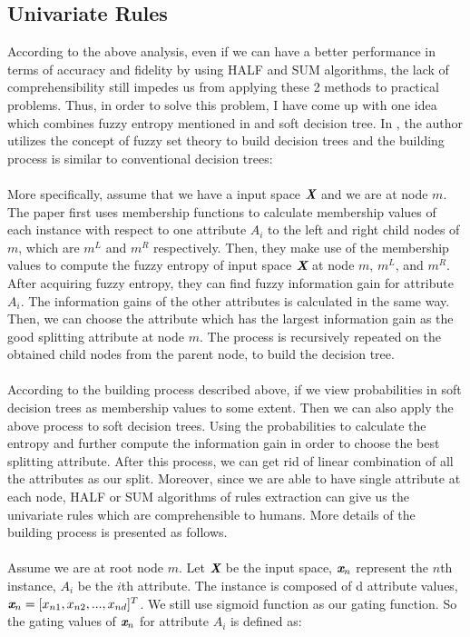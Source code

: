 \documentclass[12pt]{article}%
\begin{document}
\subsection{Univariate Rules}
According to the above analysis, even if we can have a better performance in terms of accuracy and fidelity by using HALF and SUM algorithms, the lack of comprehensibility still impedes us from applying these 2 methods to practical problems. Thus, in order to solve this problem, I have come up with one idea which combines fuzzy entropy mentioned in \cite{kumar2016ensemble} and soft decision tree. In \cite{kumar2016ensemble}, the author utilizes the concept of fuzzy set theory to build decision trees and the building process is similar to conventional decision trees:
\\\\
More specifically, assume that we have a input space $\emph{\textbf X}$ and we are at node $m$. The paper first uses membership functions to calculate membership values of each instance with respect to one attribute $A_i$ to the left and right child nodes of $m$, which are $m^L$ and $m^R$ respectively. Then, they make use of the membership values to compute the fuzzy entropy of input space $\emph{\textbf X}$ at node $m$, $m^L$, and $m^R$. After acquiring fuzzy entropy, they can find fuzzy information gain for attribute $A_i$. The information gains of the other attributes is calculated in the same way. Then, we can choose the attribute which has the largest information gain as the good splitting attribute at node $m$. The process is recursively repeated on the obtained child nodes from the parent node, to build the decision tree.
\\\\
According to the building process described above, if we view probabilities in soft decision trees as membership values to some extent. Then we can also apply the above process to soft decision trees. Using the probabilities to calculate the entropy and further compute the information gain in order to choose the best splitting attribute. After this process, we can get rid of linear combination of all the attributes as our split. Moreover, since we are able to have single attribute at each node, HALF or SUM algorithms of rules extraction can give us the univariate rules which are comprehensible to humans. More details of the building process is presented as follows.
\\\\
Assume we are at root node $m$. Let $\emph{\textbf X}$ be the input space, $\emph{\textbf x}_n$ represent the $n$th instance, $A_i$ be the $i$th attribute. The instance is composed of d attribute values, $\emph{\textbf x}_n = [x_{n1},x_{n2},...,x_{nd}]^T$. We still use sigmoid function as our gating function. So the gating values of $\emph{\textbf x}_n$ for attribute $A_i$ is defined as:
\end{document}
